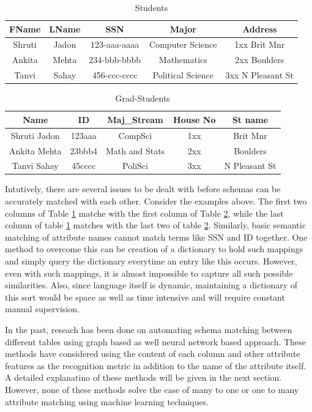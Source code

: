 \documentclass[conference]{IEEEtran}
\begin{document}
\begin{table}[h]
\centering
\caption{Students}
\begin{tabular}{|c|c|c|c|c|}
\hline
FName & LName & SSN & Major & Address\\
\hline \hline
Shruti & Jadon & 123-aaa-aaaa & Computer Science & 1xx Brit Mnr\\
Ankita & Mehta & 234-bbb-bbbb & Mathematics & 2xx Boulders\\
Tanvi & Sahay & 456-ccc-cccc & Political Science & 3xx N Pleasant St\\
\hline
\end{tabular}
\label{students}
\end{table}

\begin{table}[h]
\centering
\caption{Grad-Students}
\begin{tabular}{|c|c|c|c|c|}
\hline
Name & ID & Maj\_Stream & House No & St name\\
\hline \hline
Shruti Jadon & 123aaa & CompSci & 1xx & Brit Mnr\\
Ankita Mehta & 23bbb4 & Math and Stats & 2xx & Boulders\\
Tanvi Sahay & 45cccc & PoliSci & 3xx & N Pleasant St\\
\hline
\end{tabular}
\label{grad-students}
\end{table}

\noindent
Intutively, there are several issues to be dealt with before schemas can be accurately matched with each other. Consider the examples above. The first two columns of Table \ref{students} matche with the first column of Table \ref{grad-students}, while the last column of table \ref{students} matches with the last two of table \ref{grad-students}. Similarly, basic semantic matching of attribute names cannot match terms like SSN and ID together. One method to overcome this can be creation of a dictionary to hold such mappings and simply query the dictionary everytime an entry like this occurs. However, even with such mappings, it is almost impossible to capture all such possible similarities. Also, since language itself is dynamic, maintaining a dictionary of this sort would be space as well as time intensive and will require constant manual supervision. 

In the past, reseach has been done on automating schema matching between different tables using graph based as well neural network based approach. These methods have considered using the content of each column and other attribute features as the recognition metric in addition to the name of the attribute itself. A detailed explanatino of these methods will be given in the next section. However, none of these methods solve the case of many to one or one to many attribute matching using machine learning techniques. 
\end{document}
